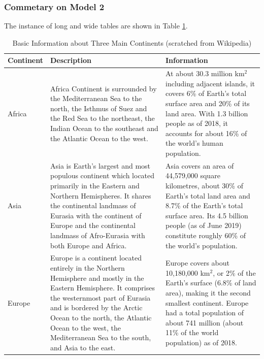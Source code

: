 \documentclass[12pt]{article}  %
\begin{document}
\newpage







\clearpage
\subsubsection{Commetary on Model 2}
The instance of long and wide tables are shown in Table \ref{tb:longtable}.

\begin{longtable}{ p{4em} p{14em} p{14em} }
\caption{Basic Information about Three Main Continents (scratched from Wikipedia)}
\label{tb:longtable}\\
\toprule
Continent & Description & Information \\
\midrule
Africa & Africa Continent is surrounded by the Mediterranean Sea to the
north, the Isthmus of Suez and the Red Sea to the northeast, the Indian
Ocean to the southeast and the Atlantic Ocean to the west. &
At about 30.3 million km$^2$ including adjacent islands, it covers 6\%
of Earth's total surface area and 20\% of its land area. With 1.3
billion people as of 2018, it accounts for about 16\% of the world's
human population. \\
\midrule
Asia & Asia is Earth's largest and most populous continent which
located primarily in the Eastern and Northern Hemispheres.
It shares the continental landmass of Eurasia with the continent
of Europe and the continental landmass of Afro-Eurasia with both
Europe and Africa. &
Asia covers an area of 44,579,000 square kilometres, about 30\%
of Earth's total land area and 8.7\% of the Earth's total surface
area. Its 4.5 billion people (as of June 2019) constitute roughly
60\% of the world's population. \\
\midrule
Europe & Europe is a continent located entirely in the Northern
Hemisphere and mostly in the Eastern Hemisphere. It comprises the
westernmost part of Eurasia and is bordered by the Arctic Ocean to
the north, the Atlantic Ocean to the west, the Mediterranean Sea to
the south, and Asia to the east. &
Europe covers about 10,180,000 km$^2$, or 2\% of the Earth's surface
(6.8\% of land area), making it the second smallest
continent. Europe had a total population of about 741 million (about
11\% of the world population) as of 2018. \\
\bottomrule
\end{longtable}
\end{document}
